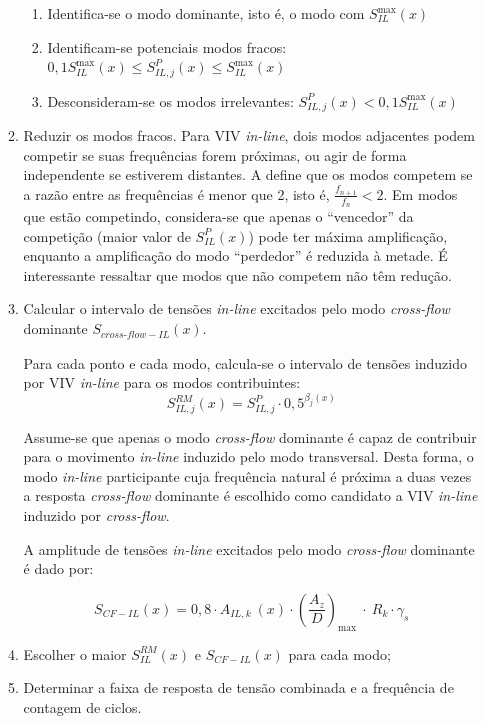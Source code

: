 \begin{itemize}
\begin{enumerate}
\begin{enumerate}
    	\item Identifica-se o modo dominante, isto é, o modo com $S_\mathit{IL}^{\max}(x)$

    	\item Identificam-se potenciais modos fracos: $0,1 S_\mathit{IL}^{\max}(x) \leq S_{\mathit{IL}, \mathit{j}}^{P}(x) \leq S_\mathit{IL}^{\max}(x)$

    	\item Desconsideram-se os modos irrelevantes: $S_{\mathit{IL}, \mathit{j}}^{P}(x) < 0,1 S_\mathit{IL}^{\max}(x)$
    \end{enumerate}

        \item Reduzir os modos fracos.
        Para VIV \textit{in-line}, dois modos adjacentes podem competir se suas frequências forem próximas, ou agir de forma independente se estiverem distantes.
        A  define que os modos competem se a razão entre as frequências é menor que 2, isto é, $\frac{f_\mathit{n+1}}{f_n} < 2$.
        Em modos que estão competindo, considera-se que apenas o ``vencedor'' da competição (maior valor de $S_{\mathit{IL}}^{P}(x)$) pode ter máxima amplificação, enquanto a amplificação do modo ``perdedor'' é reduzida à metade. É interessante ressaltar que modos que não competem não têm redução.

        \item Calcular o intervalo de tensões \textit{in-line} excitados pelo modo \textit{cross-flow} dominante $S_{\mathit{\textit{cross-flow}}-\mathit{IL}}(x)$.

        Para cada ponto e cada modo, calcula-se o intervalo de tensões induzido por VIV \textit{in-line} para os modos contribuintes:
            \[S_{\mathit{IL}, \mathit{j}}^\mathit{RM}(x) = S_{\mathit{IL}, \mathit{j}}^{P} \cdot 0,5^{\beta_j (x)}\]

        Assume-se que apenas o modo \textit{cross-flow} dominante é capaz de contribuir para o movimento \textit{in-line} induzido pelo modo transversal.
        Desta forma, o modo \textit{in-line} participante cuja frequência natural é próxima a duas vezes a resposta \textit{cross-flow} dominante é escolhido como candidato a VIV \textit{in-line} induzido por \textit{cross-flow}.

        A amplitude de tensões \textit{in-line} excitados pelo modo \textit{cross-flow} dominante é dado por:

       	    \[S_{\mathit{CF-IL}}(x) = 0,8 \cdot A_{\mathit{IL}, \mathit{k}}~(x) \cdot {\left(\frac{A_{z}}{D}\right)}_{\max}~\cdot~R_k \cdot \gamma_s\]

        \item  Escolher o maior $S_\mathit{IL}^\mathit{RM}(x)$ e $S_{\mathit{CF-IL}}(x)$ para cada modo;

        \item Determinar a faixa de resposta de tensão combinada e a frequência de contagem de ciclos.
    \end{enumerate}

\end{itemize}
